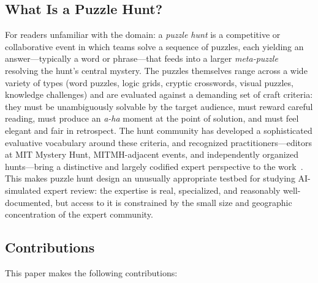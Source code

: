 \subsection{What Is a Puzzle Hunt?}

For readers unfamiliar with the domain: a \emph{puzzle hunt} is a competitive or
collaborative event in which teams solve a sequence of puzzles, each yielding an
answer---typically a word or phrase---that feeds into a larger \emph{meta-puzzle} resolving
the hunt's central mystery. The puzzles themselves range across a wide variety of types
(word puzzles, logic grids, cryptic crosswords, visual puzzles, knowledge challenges) and
are evaluated against a demanding set of craft criteria: they must be unambiguously solvable
by the target audience, must reward careful reading, must produce an \emph{a-ha} moment at
the point of solution, and must feel elegant and fair in retrospect. The hunt community has
developed a sophisticated evaluative vocabulary around these criteria, and recognized
practitioners---editors at MIT Mystery Hunt, MITMH-adjacent events, and independently
organized hunts---bring a distinctive and largely codified expert perspective to the
work~\cite{colton2012computational}. This makes puzzle hunt design an unusually appropriate
testbed for studying AI-simulated expert review: the expertise is real, specialized, and
reasonably well-documented, but access to it is constrained by the small size and
geographic concentration of the expert community.

\subsection{Contributions}

This paper makes the following contributions:

